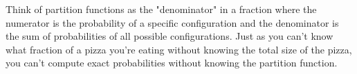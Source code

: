 Think of partition functions as the "denominator" in a fraction where the numerator is the probability of a specific configuration and the denominator is the sum of probabilities of all possible configurations. Just as you can't know what fraction of a pizza you're eating without knowing the total size of the pizza, you can't compute exact probabilities without knowing the partition function.











